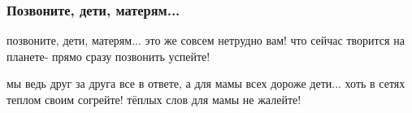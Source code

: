  
 
 

\subsubsection{Позвоните, дети, матерям...}

позвоните, дети, матерям...
это же совсем нетрудно вам!
что сейчас творится на планете-
прямо сразу позвонить успейте!

мы ведь друг за друга все в ответе,
а для мамы всех дороже дети...
хоть в сетях теплом своим согрейте!
тёплых слов для мамы не жалейте!
